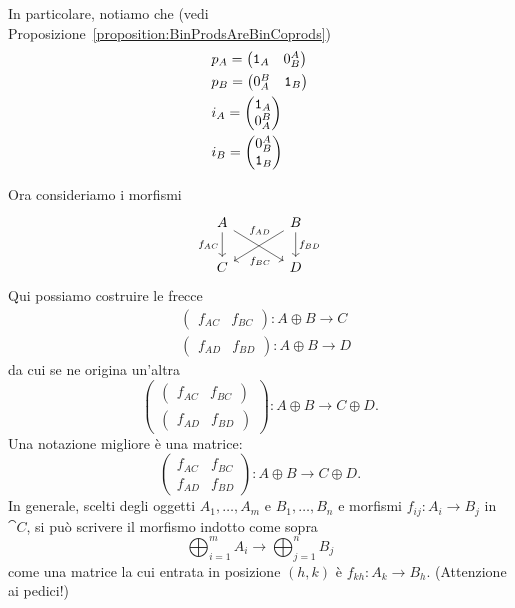 In particolare, notiamo che (vedi
Proposizione~\ref{proposition:BinProdsAreBinCoprods})
\begin{align*}
  & p_A =
    \begin{pmatrix}
      \mathtt 1_A & 0_B^A
    \end{pmatrix} \\
  & p_B =
    \begin{pmatrix}
      0_A^B & \mathtt 1_B
    \end{pmatrix} \\
  & i_A =
    \begin{pmatrix}
      \mathtt 1_A \\ 0_A^B
    \end{pmatrix} \\
  & i_B =
    \begin{pmatrix}
      0_B^A \\ \mathtt 1_B
    \end{pmatrix}
\end{align*}

Ora consideriamo i morfismi
\[
  \begin{tikzcd}[column sep=large]
    A \ar["{f_{AC}}", d, swap] \ar["{f_{AD}}" near start, dr] & B
    \ar["{f_{BC}}" near end, dl] \ar["{f_{BD}}", d] \\
    C & D
  \end{tikzcd}
\]
Qui possiamo costruire le frecce
\begin{align*}
  & \begin{pmatrix} f_{AC} & f_{BC} \end{pmatrix} : A \oplus B \to C \\
  & \begin{pmatrix} f_{AD} & f_{BD} \end{pmatrix} : A \oplus B \to D
\end{align*}
da cui se ne origina un'altra
\[
  \begin{pmatrix}
    \begin{pmatrix} f_{AC} & f_{BC} \end{pmatrix} \\
    \begin{pmatrix} f_{AD} & f_{BD} \end{pmatrix}
  \end{pmatrix} : A \oplus B \to C \oplus D .
\]
Una notazione migliore è una matrice:
\[
  \begin{pmatrix}
    f_{AC} & f_{BC} \\
    f_{AD} & f_{BD}
  \end{pmatrix} : A \oplus B \to C \oplus D .
\]
In generale, scelti degli oggetti \(A_1, \dots, A_m\) e
\(B_1, \dots, B_n\) e morfismi \(f_{ij} : A_i \to B_j\) in \(\cat C\),
si può scrivere il morfismo indotto come sopra
\[
  \bigoplus_{i=1}^m A_i \to \bigoplus_{j=1}^n B_j
\]
come una matrice la cui entrata in posizione \((h, k)\) è
\(f_{k h} : A_k \to B_h \). (Attenzione ai pedici!)

